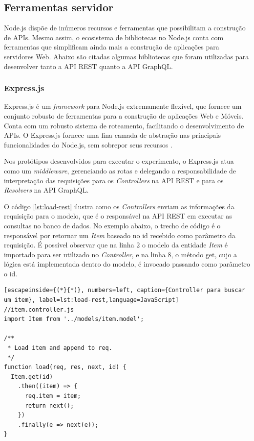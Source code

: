 \subsection{Ferramentas servidor}

Node.js dispõe de inúmeros recursos e ferramentas que possibilitam a construção de APIs. Mesmo assim, o ecosistema de bibliotecas no Node.js conta com ferramentas que simplificam ainda mais a construção de aplicações para servidores Web. Abaixo são citadas algumas bibliotecas que foram utilizadas para desenvolver tanto a API REST quanto a API GraphQL. 

\subsubsection*{Express.js}

Express.js é um \textit{framework} para Node.js extremamente flexível, que fornece um conjunto robusto de ferramentas para a construção de aplicações Web e Móveis. Conta com um robusto sistema de roteamento, facilitando o desenvolvimento de APIs. O Express.js fornece uma fina camada de abstração nas principais funcionalidades do Node.js, sem sobrepor seus recursos \cite{express}.

Nos protótipos desenvolvidos para executar o experimento, o Express.js atua como um \textit{middleware}, gerenciando as rotas e delegando a responsabilidade de interpretação das requisições para os \textit{Controllers} na API REST e para os \textit{Resolvers} na API GraphQL.

O código \ref{lst:load-rest} ilustra como os \textit{Controllers} enviam as informações da requisição para o modelo, que é o responsável na API REST em executar as consultas no banco de dados. No exemplo abaixo, o trecho de código é o responsável por retornar um \textit{Item} baseado no \textup{id} recebido como parâmetro da requisição. É possível observar que na linha 2 o modelo da entidade \textit{Item} é importado para ser utilizado no \textit{Controller}, e na linha 8, o método \textup{get}, cujo a lógica está implementada dentro do modelo, é invocado passando como parâmetro o \textup{id}.

\begin{lstlisting}[escapeinside={(*}{*)}, numbers=left, caption={Controller para buscar um item}, label=lst:load-rest,language=JavaScript]
//item.controller.js
import Item from '../models/item.model';

/**
 * Load item and append to req.
 */
function load(req, res, next, id) {
  Item.get(id)
    .then((item) => {
      req.item = item;
      return next();
    })
    .finally(e => next(e));
}

\end{lstlisting}

